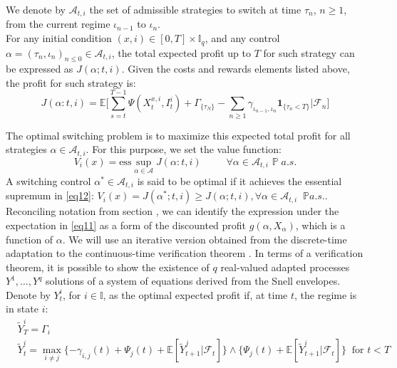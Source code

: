\documentclass{article}
\begin{document}
We denote by $\mathcal{A}_{t, i}$ the set of admissible strategies to switch at time $\tau_n$, $n \geq 1$, from the current regime $\iota_{n-1}$ to $\iota_{n}$. \\

For any initial condition $(x, i) \in [0, T] \times \mathbb{I}_q$, and any control $\alpha=(\tau_n, \iota_n)_{n \leq 0} \in \mathcal{A}_{t, i}$, the total expected profit up to $T$ for such strategy can be expressed as $J(\alpha; t, i)$. Given the costs and rewards elements listed above, the profit for such strategy is:
\begin{equation}\label{eq11}
J(\alpha: t, i) = \mathbb{E} \Big[ \sum_{s=t}^{T-1} \Psi(X_t^{x, i}, I_t^i) + \Gamma_{ \{ \tau_N \} } - \sum_{n \geq 1}\gamma_{\iota_{n-1}, \iota_n} \mathbf{1}_{ \{ \tau_n < T \} }  | \mathcal{F}_n   \Big]
\end{equation}

The optimal switching problem is to maximize this expected total profit for all strategies $\alpha \in \mathcal{A}_{t, i}$. For this purpose, we set the value function:
\begin{equation}\label{eq12}
V_i(x)=\text{ess}\sup_{\alpha \in \mathcal{A}} J(\alpha: t, i) \;\;\;\;\;\;\;\;\; \forall \alpha \in \mathcal{A}_{t, i} \,\, \mathbb{P}\; a.s. 
\end{equation}
A switching control $\alpha^{\ast} \in \mathcal{A}_{t, i}$ is said to be optimal if it achieves the essential supremum in \ref{eq12}: $V_i(x) = J(\alpha^{\ast};t, i)  \geq J(\alpha; t, i), \forall \alpha \in \mathcal{A}_{t, i} \;\; \mathbb{P } a.s.$. Reconciling notation from section \cite{becker2019deep}, we can identify the expression under the expectation in \ref{eq11} as a form of the discounted profit $g(\alpha, X_{\alpha})$, which is a function of $\alpha$. We will use an iterative version obtained from the discrete-time adaptation to the continuous-time verification theorem \citep{djehiche2009finite, martyr2016dynamic}. In terms of a verification theorem, it is possible to show the existence of $q$ real-valued adapted processes $Y^1, \ldots, Y^q$ solutions of a system of equations derived from the Snell envelopes. Denote by $Y_t^i$, for $i \in \mathbb{I}$, as the optimal expected profit if, at time $t$, the regime is in state $i$: 
\begin{equation}
\begin{split}
    &\tilde{Y}^i_T=\Gamma_i\\
    &\tilde{Y}^i_t=\max_{i \neq j}\{- \gamma_{i, j}(t)+\Psi_j(t)+ \mathbb{E}[\tilde{Y}^j_{t+1} | \mathcal{F}_t]  \} \land \{\Psi_j(t)+ \mathbb{E}[\tilde{Y}^i_{t+1} | \mathcal{F}_t]  \} \;\; \text{for } t<T
\end{split}
\end{equation}
\end{document}

